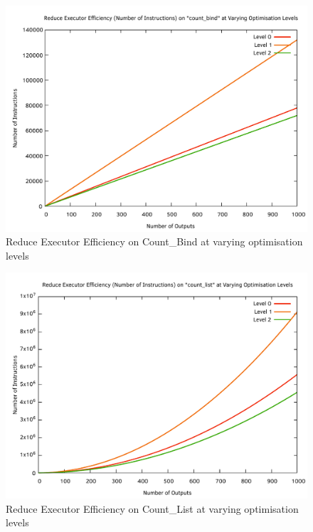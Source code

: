\begin{figure}[htb]
    \centering
    \includegraphics[width=\textwidth - 60pt]{04_results/images/reduce_count_bind_efficiency}
    \caption{Reduce Executor Efficiency on Count\_Bind at varying optimisation levels}
    \label{fig:reduce_count_bind_efficiency}
\end{figure}
\begin{figure}[htb]
    \centering
    \includegraphics[width=\textwidth - 60pt]{04_results/images/reduce_count_list_efficiency}
    \caption{Reduce Executor Efficiency on Count\_List at varying optimisation levels}
    \label{fig:reduce_count_list_efficiency}
\end{figure}
